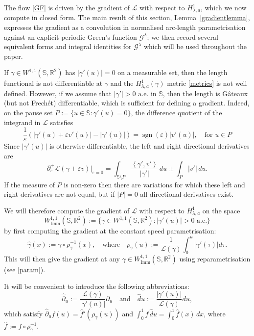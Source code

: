 \documentclass[a4paper,11pt]{amsart}
\theoremstyle{definition}\newtheorem*{definition}{Definition}
\theoremstyle{definition} \newtheorem{proposition}[theorem]{Proposition}
\theoremstyle{definition}\newtheorem{lemma}[theorem]{Lemma}
\theoremstyle{definition}\newtheorem{corollary}[theorem]{Corollary}
\theoremstyle{definition}\newtheorem{example}{Example}
\theoremstyle{remark}\newtheorem*{remark}{Remark}
\def\phat{\hat{\partial} }
\def\R{\mathbb{R}}
\def\S{\mathbb{S}}
\def\G{\mathcal G^\lambda}
\newcommand{\ip}[1]{{\left \langle {#1} \right \rangle}}
\newcommand{\abs}[1]{\left | {#1}\right |}
\DeclareMathOperator{\imm}{Imm}
\DeclareMathOperator{\sgn}{sgn}
\def\length{\mathcal L}
\def\wimm{W^{1,1}_{\imm}(\S,\R^2)}
\begin{document}
The flow \eqref{GF} is driven by the gradient of $\length$ with respect to $H^1_{\lambda,a}$, which we now compute in closed form. The main result of this section, Lemma~\ref{gradientlemma}, expresses the gradient as a convolution in normalised arc-length parametrisation against an explicit periodic Green’s function $\G$; we then record several equivalent forms and integral identities for $\G$ which will be used throughout the paper. 

If  $\gamma\in W^{1,1}(\S,\R^2)$ has $|\gamma'(u)|=0$ on a measurable set, then the length functional is not differentiable at $\gamma$ and the $H^1_{\lambda,a}(\gamma)$ metric \eqref{metrics} is not well defined.
However, if we assume that $|\gamma'|>0 \text{ a.e.}$ in $\S$, then the length is G\^ateaux (but not Frech\'et) differentiable, which is sufficient for defining a gradient. Indeed, on the pause set $P:=\{u\in\S:\gamma'(u)=0\}$, the difference quotient of the integrand in $\length$ satisfies
\[
\frac{1}{\varepsilon} (\abs{\gamma'(u)+\varepsilon v'(u)}-\abs{\gamma'(u)})=\sgn(\varepsilon)\abs{v'(u)}, \quad \text{for } u\in P
\]
Since $|\gamma'(u)|$ is otherwise differentiable, the left and right directional derivatives are 
\[
\partial_\varepsilon^\pm \length(\gamma+\varepsilon v)\big|_{\varepsilon=0}
=\int_{\S\setminus P}\frac{\ip{\gamma',v'}}{\abs{\gamma'}}\,du
\pm\int_{P}\abs{v'}\,du.
\]
If the measure of $P$ is non-zero then there are variations for which these left and right derivatives are not equal, but if $|P|=0$ all directional derivatives exist.

We will therefore compute the gradient of $\length$ with respect to $H^1_{\lambda,a}$ on the space
\[
\wimm:=\{\gamma\in W^{1,1}(\S,\R^2): |\gamma'(u)|>0 \text{ a.e.}\}
\]
by first computing the gradient at the constant speed parametrisation:
\[ \hat\gamma(x):= \gamma \circ \rho_\gamma^{-1}(x) ,\quad  \text{where} \quad  \rho_\gamma (u):=\frac{1}{\length(\gamma)}\int_0^u\abs{\gamma'(\tau)}d\tau.\] 
This will then give the gradient at any $\gamma\in\wimm$ using reparametrisation (see \eqref{param}).

It will be convenient to introduce the following abbreviations:
\[
\phat_u:=\frac{\length(\gamma)}{\abs{\gamma'(u)}}\partial_u \quad \text{and}\quad \hat du :=\frac{\abs{\gamma'(u)}}{\length(\gamma)}du,
\]
which satisfy $\hat\partial_u f(u) = \hat{f}'(\rho_\gamma(u))$ and $\int_0^1 f\,\hat{d}u = \int_0^1 \hat{f}(x)\,dx$, where $\hat{f} := f \circ \rho_\gamma^{-1}$.
\end{document}

